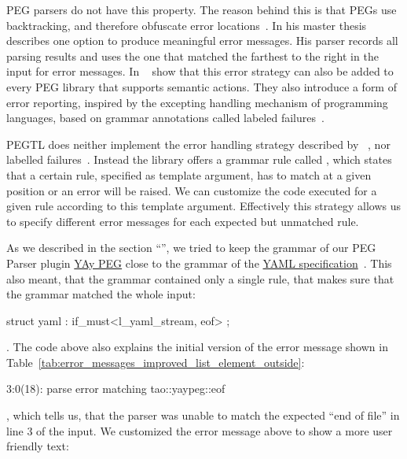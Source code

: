 \Gls{PEG} parsers do not have this property. The reason behind this is that \glspl{PEG} use backtracking, and therefore obfuscate error locations~\cite{ruefenacht2016error}. In his master thesis~\cite{ford2002packrat} \citeauthor{ford2002packrat} describes one option to produce meaningful error messages. His parser records all parsing results and uses the one that matched the farthest to the right in the input for error messages. In ~\cite{maidl2016129} \citeauthor{maidl2016129} show that this error strategy can also be added to every \gls{PEG} library that supports semantic actions. They also introduce a form of error reporting, inspired by the excepting handling mechanism of programming languages, based on grammar annotations called labeled failures~\cite{maidl2016129}.

PEGTL does neither implement the error handling strategy described by \citeauthor{ford2002packrat}~\cite{ford2002packrat}, nor labelled failures~\cite{maidl2016129}. Instead the library offers a grammar rule called , which states that a certain rule, specified as template argument, has to match at a given position or an error will be raised. We can customize the code executed for a given  rule according to this template argument. Effectively this strategy allows us to specify different error messages for each expected but unmatched rule.

As we described in the section “”, we tried to keep the grammar of our PEG Parser plugin \href{https://libelektra.org/plugins/yaypeg}{YAy PEG} close to the grammar of the \href{http://yaml.org/spec/1.2/spec}{YAML specification}~\cite{ben2009yaml}. This also meant, that the grammar contained only a single  rule, that makes sure that the grammar matched the whole input:

\begin{cppcode}
  struct yaml : if_must<l_yaml_stream, eof> {};
\end{cppcode}

. The code above also explains the initial version of the error message shown in Table~\ref{tab:error_messages_improved_list_element_outside}:

\begin{textcode}
  3:0(18): parse error matching tao::yaypeg::eof
\end{textcode}

, which tells us, that the parser was unable to match the expected “end of file” in line 3 of the input. We customized the error message above to show a more user friendly text:

